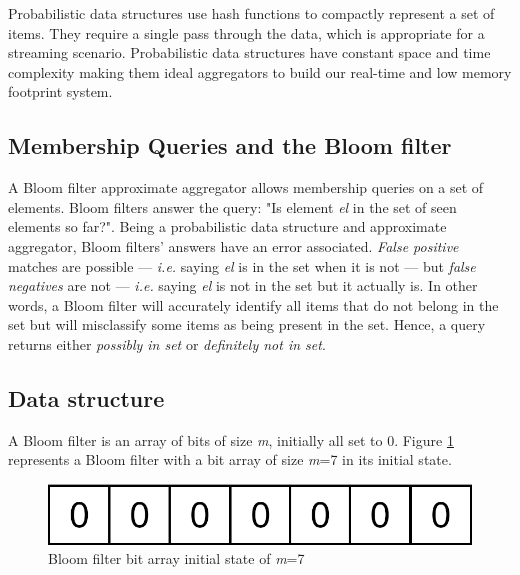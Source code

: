 Probabilistic data structures use hash functions to compactly represent a set of items. They require a single pass through the data, which is appropriate for a streaming scenario. Probabilistic data structures have constant space and time complexity \cite{Singh-PDS-BIGD} making them ideal aggregators to build our real-time and low memory footprint system. 

\subsection{Membership Queries and the Bloom filter} \label{sec:bloom}
A Bloom filter \cite{BLOOM-BLOOMFILTER} approximate aggregator allows membership queries on a set of elements. Bloom filters answer the query: "Is element \textit{el} in the set of seen elements so far?". Being a probabilistic data structure and approximate aggregator, Bloom filters' answers have an error associated. \textit{False positive} matches are possible --- \textit{i.e.} saying \textit{el} is in the set when it is not --- but \textit{false negatives} are not --- \textit{i.e.} saying \textit{el} is not in the set but it actually is. In other words, a Bloom filter will accurately identify all items that do not belong in the set but will misclassify some items as being present in the set. Hence, a query returns either \textit{possibly in set} or \textit{definitely not in set}.

\subsection*{Data structure}
A Bloom filter is an array of bits of size \textit{m}, initially all set to 0. Figure \ref{fig:initial-bloom-filter} represents a Bloom filter with a bit array of size \textit{m}=7 in its initial state.

\begin{figure}[!htb]
    \begin{center}
      \includegraphics[scale=1.1]{figures/initial-bloom.png}
      \caption[Bloom filter initial state]{Bloom filter bit array initial state of \textit{m}=7}
      \label{fig:initial-bloom-filter}
    \end{center}
\end{figure}

